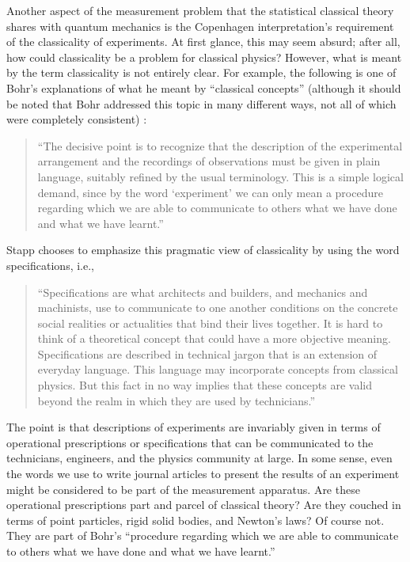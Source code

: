 \documentclass [12pt]{revtex4}
\begin{document}
Another aspect of the measurement problem that the statistical
classical theory shares with quantum mechanics is the Copenhagen
interpretation's requirement of the {classicality of
experiments}. At first glance, this may seem absurd; after all, how
could classicality be a problem for classical physics? However, what
is meant by the term {classicality} is not entirely clear.
For example, the following is one of Bohr's explanations of what he
meant by ``classical concepts'' (although it should be noted that
Bohr addressed this topic in many different ways, not all of which
were completely consistent) \cite{B1963}:
\begin{quote}
``The decisive point is to recognize that the description of the
experimental arrangement and the recordings of observations must be
given in plain language, suitably refined by the usual terminology.
This is a simple logical demand, since by the word `experiment' we
can only mean a procedure regarding which we are able to communicate
to others what we have done and what we have learnt.''
\end{quote}
Stapp chooses to emphasize this pragmatic view of classicality by
using the word {specifications}, i.e., \cite{S1972}
\begin{quote}
``Specifications are what architects and builders, and mechanics and
machinists, use to communicate to one another conditions on the
concrete social realities or actualities that bind their lives
together. It is hard to think of a theoretical concept that could
have a more objective meaning. Specifications are described in
technical jargon that is an extension of everyday language. This
language may incorporate concepts from classical physics. But this
fact in no way implies that these concepts are valid beyond the
realm in which they are used by technicians.''
\end{quote}
The point is that descriptions of experiments are invariably given
in terms of operational prescriptions or specifications that can be
communicated to the technicians, engineers, and the physics
community at large. In some sense, even the words we use to write
journal articles to present the results of an experiment might be
considered to be part of the measurement apparatus. Are these
operational prescriptions part and parcel of {classical
theory}? Are they couched in terms of point particles, rigid solid
bodies, and Newton's laws? Of course not. They are part of Bohr's
``procedure regarding which we are able to communicate to others
what we have done and what we have learnt.''
\end{document}
